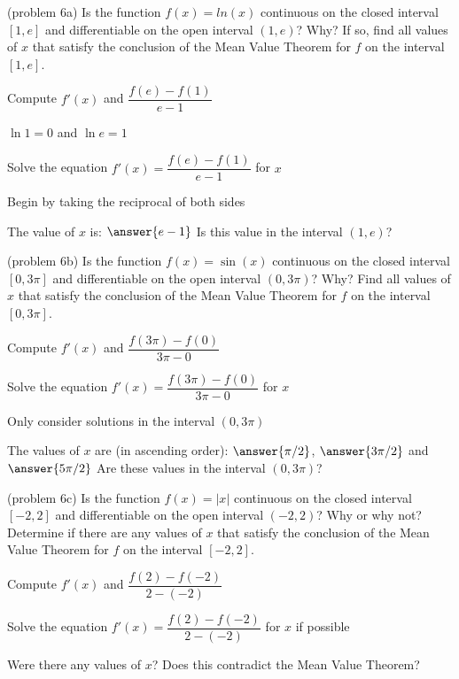 \documentclass[handout]{ximera}
\begin{document}
\begin{problem}(problem 6a) 
  Is the function $f(x) = ln(x)$ continuous on the closed interval $[1,e]$ and differentiable on the open interval $(1,e)$? Why?
  If so, find all values of $x$ that satisfy the conclusion of the Mean Value Theorem for $f$ on the interval $[1,e]$.
	
    \begin{hint}
      Compute $f'(x)$ and $\dfrac{f(e) - f(1)}{e-1}$
    \end{hint}
    \begin{hint}
    $\ln 1 = 0$ and $\ln e = 1$
    \end{hint}
		\begin{hint}
		  Solve the equation $f'(x) = \dfrac{f(e) - f(1)}{e-1}$ for $x$
		\end{hint}
    \begin{hint}
    Begin by taking the reciprocal of both sides
    \end{hint}
		
		The value of $x$ is:
		 $\answer{e-1}$
     Is this value in the interval $(1,e)$?
\end{problem}


\begin{problem}(problem 6b)
  Is the function $f(x) = \sin(x)$ continuous on the closed interval $[0, 3\pi]$ and differentiable on the open interval $(0, 3\pi)$? Why?
  Find all values of $x$ that satisfy the conclusion of the Mean Value Theorem for $f$ on the interval $[0, 3\pi]$.
	
    \begin{hint}
      Compute $f'(x)$ and $\dfrac{f(3\pi) - f(0)}{3\pi - 0}$
    \end{hint}
		\begin{hint}
		  Solve the equation $f'(x) = \dfrac{f(3\pi) - f(0)}{3\pi - 0}$ for $x$
		\end{hint}
    \begin{hint}
    Only consider solutions in the interval $(0, 3\pi)$
    \end{hint}
		
		The values of $x$ are (in ascending order):
		 $\answer{\pi /2}$, $\answer{3\pi /2}$ and $\answer{5\pi /2}$
     Are these values in the interval $(0, 3\pi)$?
\end{problem}

\begin{problem}(problem 6c)
  Is the function $f(x) = |x|$ continuous on the closed interval $[-2,2]$ and differentiable on the open interval $(-2,2)$? Why or why not?
  Determine if there are any values of $x$ that satisfy the conclusion of the Mean Value Theorem for $f$ on the interval $[-2,2]$.
	
    \begin{hint}
      Compute $f'(x)$ and $\dfrac{f(2) - f(-2)}{2 - (-2)}$
    \end{hint}
		\begin{hint}
		  Solve the equation $f'(x) = \dfrac{f(2) - f(-2)}{2 - (-2)}$ for $x$ if possible
		\end{hint}
		
		Were there any values of $x$? Does this contradict the Mean Value Theorem?
\end{problem}

\begin{center}
\begin{foldable}
\end{foldable}
\end{center}
\end{document}
